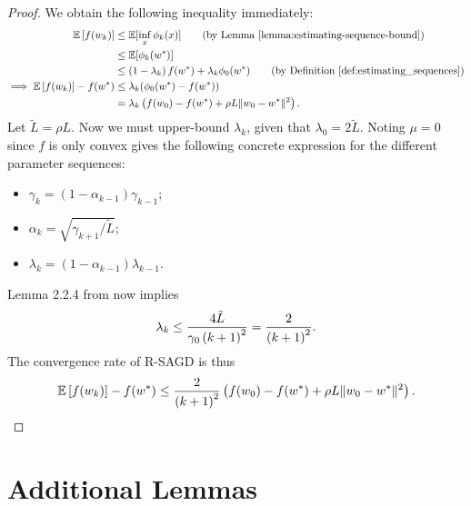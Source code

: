 \convexAGD*
\begin{proof}
    We obtain the following inequality immediately:
    \begin{align*}
        \E\sbr{f(\wk)} &\leq \E[\inf_x \phi_k(x)] \tag{by Lemma~\ref{lemma:estimating-sequence-bound}}\\
        &\leq \E[\phi_k(\wopt)] \\
        &\leq \rbr{1 - \lambda_k} f(\wopt) + \lambda_k \phi_0(\wopt) \tag{by Definition~\ref{def:estimating_sequences}}\\
        \implies \E\sbr{f(\wk)} - f(\wopt) &\leq \lambda_k (\phi_0(\wopt) - f(\wopt))\\
                                           &= \lambda_k \rbr{f(\w_0) - f(\wopt) + \rho L \norm{\w_0 - \wopt}^2 }.
    \end{align*}
    Let \( \tilde L = \rho L \). 
    Now we must upper-bound \( \lambda_k \), given that \( \lambda_0 = 2 \tilde L \).
    Noting \( \mu = 0 \) since \( f \) is only convex gives the following concrete expression for the different parameter sequences: 
    \begin{itemize}
        \item \(  \gamma_{k}  = (1 - \alpha_{k-1}) \gamma_{k-1} \);
        \item \( \alpha_{k} = \sqrt{\gamma_{k+1} / \tilde L} \);
        \item \( \lambda_{k} = (1 - \alpha_{k-1}) \lambda_{k-1} \).
    \end{itemize}
    Lemma 2.2.4 from \citet{nesterov2004lectures} now implies 
    \[ \lambda_k \leq \frac{4 \tilde L}{\gamma_0 \left(k + 1\right)^2} = \frac{2}{\left(k + 1\right)^2}. \]
    The convergence rate of R-SAGD is thus 
    \[  \mathbb{E}\left[f(w_k)\right] - f(w^*) \leq \frac{2}{\left(k+1\right)^2}\left(f(w_0) - f(w^*) + \rho L \|w_0 - w^*\|^2 \right). \]
\end{proof}


\section{Additional Lemmas}\label{app:additional-lemmas}

